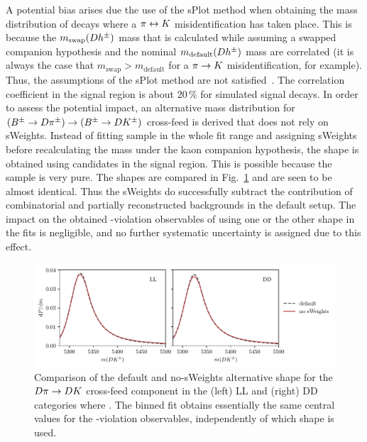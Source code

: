 
A potential bias arises due the use of the sPlot method when obtaining the mass distribution of decays where a $\pi\leftrightarrow {\ensuremath{K}}$ misidentification has taken place. This is because the $m_\mathrm{swap}({D} h^\pm)$ mass that is calculated while assuming a swapped companion hypothesis and the nominal $m_\mathrm{default}({D} h^\pm)$ mass are correlated (it is always the case that $m_\mathrm{swap} > m_\mathrm{default}$ for a $\pi\rightarrow{\ensuremath{K}}$ misidentification, for example). Thus, the assumptions of the sPlot method are not satisfied~\cite{sPlot}. The correlation coefficient in the signal region is about 20\,\% for simulated signal decays. In order to assess the potential impact, an alternative mass distribution for $({{{B}^\pm}\rightarrow{\ensuremath{D}}{\ensuremath{{\pi}^\pm}}})\rightarrow({{{B}^\pm}\rightarrow{\ensuremath{D}}{\ensuremath{{K}^\pm}}})$ cross-feed is derived that does not rely on sWeights. Instead of fitting \BtoDpi sample in the whole fit range and assigning sWeights before recalculating the \B mass under the kaon companion hypothesis, the shape is obtained using \BtoDpi candidates in the signal region. This is possible because the \BtoDpi sample is very pure. The shapes are compared in Fig.~\ref{fig:compare_alt_noSW_misID_shapes} and are seen to be almost identical. Thus the sWeights do successfully subtract the contribution of combinatorial and partially reconstructed backgrounds in the default setup. The impact on the obtained \CP-violation observables of using one or the other shape in the fits is negligible, and no further systematic uncertainty is assigned due to this effect. 

\begin{figure}[tp]
    \centering
    \includegraphics[width=0.85\columnwidth]{figures/analysis/systematics/misID_sW.pdf}
    \caption{Comparison of the default and no-sWeights alternative shape for the ${D}\pi\rightarrow{\ensuremath{D}}{\ensuremath{K}}$ cross-feed component in the (left) LL and (right) DD categories where \DtoKspipi. The binned fit obtains essentially the same central values for the \CP-violation observables, independently of which shape is used. }
    \label{fig:compare_alt_noSW_misID_shapes}
\end{figure}


